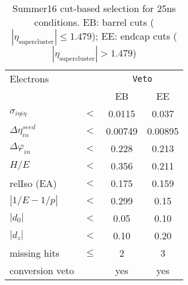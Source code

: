 
\begin{table}[htb]
 \centering
    \begin{tabular}{lccc}
     \hline

    Electrons                   &        & \multicolumn{2}{c}{\texttt{Veto}}\\
                                &        & EB      & EE     \\
 \hline
    $\sigma_{i\eta i\eta} $     & $ < $  &0.0115   &0.037  \\
    $\Delta \eta_{in}^{seed}$   & $ < $  &0.00749  &0.00895 \\
    $\Delta \varphi_{in} $      & $ < $  &0.228    &0.213   \\
    $H/E $                      & $ < $  &0.356    &0.211   \\
    relIso (EA)                 & $<$    &0.175    &0.159   \\
    $|1/E - 1/p|$               & $ < $  &0.299    &0.15    \\
    $|d_0|$                     & $ < $  &0.05     &0.10   \\
    $|d_z|$                     & $ < $  &0.10     &0.20   \\
    missing hits                & $\leq$ &2        &3       \\
    conversion veto             &        &  yes    &yes     \\
    
 \hline
\end{tabular}
\caption{ Summer16 cut-based selection for 25ns conditions. EB: barrel cuts ( $|\eta_\text{supercluster}| \leq 1.479$); EE: endcap cuts ( $|\eta_\text{supercluster}| > 1.479$)}
\label{tab:EGcutBar}
\end{table}

